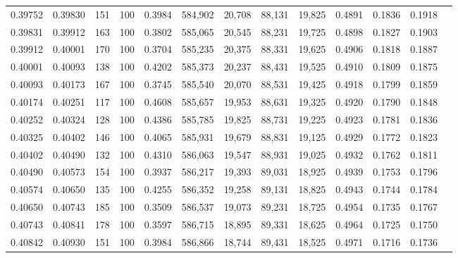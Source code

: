 \begin{tabular}{rrrrrrrrrrrrr}
0.39752 & 0.39830 &   151 & 100 &                                     0.3984 & 584,902 &  20,708 &  88,131 &  19,825 & 0.4891 & 0.1836 & 0.1918 \\
0.39831 & 0.39912 &   163 & 100 &                                     0.3802 & 585,065 &  20,545 &  88,231 &  19,725 & 0.4898 & 0.1827 & 0.1903 \\
0.39912 & 0.40001 &   170 & 100 &                                     0.3704 & 585,235 &  20,375 &  88,331 &  19,625 & 0.4906 & 0.1818 & 0.1887 \\
0.40001 & 0.40093 &   138 & 100 &                                     0.4202 & 585,373 &  20,237 &  88,431 &  19,525 & 0.4910 & 0.1809 & 0.1875 \\
0.40093 & 0.40173 &   167 & 100 &                                     0.3745 & 585,540 &  20,070 &  88,531 &  19,425 & 0.4918 & 0.1799 & 0.1859 \\
0.40174 & 0.40251 &   117 & 100 &                                     0.4608 & 585,657 &  19,953 &  88,631 &  19,325 & 0.4920 & 0.1790 & 0.1848 \\
0.40252 & 0.40324 &   128 & 100 &                                     0.4386 & 585,785 &  19,825 &  88,731 &  19,225 & 0.4923 & 0.1781 & 0.1836 \\
0.40325 & 0.40402 &   146 & 100 &                                     0.4065 & 585,931 &  19,679 &  88,831 &  19,125 & 0.4929 & 0.1772 & 0.1823 \\
0.40402 & 0.40490 &   132 & 100 &                                     0.4310 & 586,063 &  19,547 &  88,931 &  19,025 & 0.4932 & 0.1762 & 0.1811 \\
0.40490 & 0.40573 &   154 & 100 &                                     0.3937 & 586,217 &  19,393 &  89,031 &  18,925 & 0.4939 & 0.1753 & 0.1796 \\
0.40574 & 0.40650 &   135 & 100 &                                     0.4255 & 586,352 &  19,258 &  89,131 &  18,825 & 0.4943 & 0.1744 & 0.1784 \\
0.40650 & 0.40743 &   185 & 100 &                                     0.3509 & 586,537 &  19,073 &  89,231 &  18,725 & 0.4954 & 0.1735 & 0.1767 \\
0.40743 & 0.40841 &   178 & 100 &                                     0.3597 & 586,715 &  18,895 &  89,331 &  18,625 & 0.4964 & 0.1725 & 0.1750 \\
0.40842 & 0.40930 &   151 & 100 &                                     0.3984 & 586,866 &  18,744 &  89,431 &  18,525 & 0.4971 & 0.1716 & 0.1736 \\

\end{tabular}
